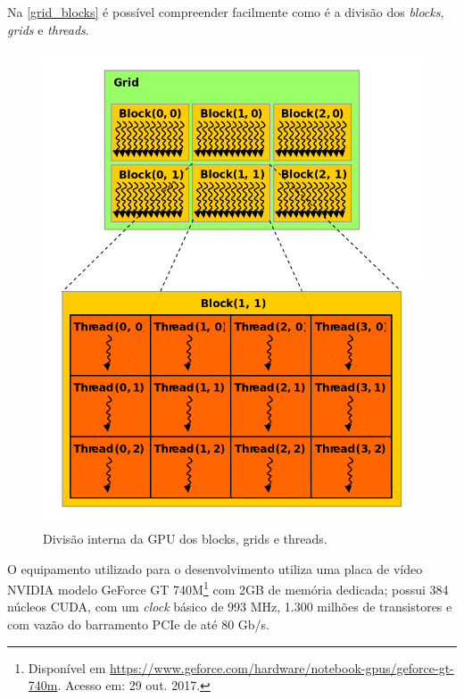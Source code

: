 \documentclass[
	12pt,				%
	twoside,			%
	a4paper,			%
	english,			%
	french,				%
	spanish,			%
	brazil				%
	]{abntex2}
\begin{document}


Na \autoref{grid_blocks} é possível compreender facilmente como é a
divisão dos \emph{blocks}, \emph{grids} e \emph{threads}.

\begin{figure}[ht]
    \caption{\label{grid_blocks} Divisão interna da GPU dos blocks, grids e threads.}
    \begin{center}
        \includegraphics[scale=0.4]{imagens/block-grid.jpg}
    \end{center}
\end{figure}

O equipamento utilizado para o desenvolvimento utiliza uma placa de
vídeo NVIDIA modelo GeForce GT 740M\footnote{Disponível em
  \url{https://www.geforce.com/hardware/notebook-gpus/geforce-gt-740m}.
  Acesso em: 29 out. 2017.} com 2GB de memória dedicada; possui 384
núcleos CUDA, com um \emph{clock} básico de 993 MHz, 1.300 milhões de
transistores e com vazão do barramento PCIe de até 80 Gb/s.
\end{document}
